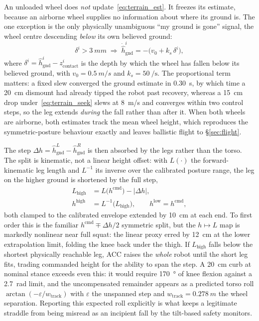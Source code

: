 \documentclass[conference]{IEEEtran}
\begin{document}
An unloaded wheel does \emph{not} update~\eqref{eq:terrain_est}. It freezes its
estimate, because an airborne wheel supplies no information about where its
ground is. The one exception is the only physically unambiguous
``my ground is gone'' signal, the wheel centre descending \emph{below} its own
believed ground:
\begin{equation}
\delta^{i} > \SI{3}{mm}
\;\Rightarrow\;
\dot{\hat{h}}_{\text{gnd}}^{i} = -\big(v_0 + k_s \,\delta^{i}\big),
\label{eq:terrain_seek}
\end{equation}
where $\delta^{i} = \hat{h}_{\text{gnd}}^{i} - z_{\text{contact}}^{i}$ is the
depth by which the wheel has fallen below its believed ground,
with $v_0 = \SI{0.5}{m/s}$ and $k_s = \SI{50}{\per\second}$. The
proportional term matters: a fixed slew converged the ground estimate in
\SI{0.30}{s}, by which time a \SI{20}{cm} dismount had already tipped the robot
past recovery, whereas a \SI{15}{cm} drop under~\eqref{eq:terrain_seek} slews at
\SI{8}{m/s} and converges within two control steps, so the leg extends
\emph{during} the fall rather than after it. When both wheels are airborne, both
estimates track the mean wheel height, which reproduces the symmetric-posture
behaviour exactly and leaves ballistic flight to
\S\ref{sec:flight}.

The step $\Delta h = \hat{h}_{\text{gnd}}^{L} - \hat{h}_{\text{gnd}}^{R}$ is
then absorbed by the legs rather than the torso. The split is kinematic, not a
linear height offset: with $L(\cdot)$ the forward-kinematic leg length and
$L^{-1}$ its inverse over the calibrated posture range, the leg on the higher
ground is shortened by the full step,
\begin{align}
L_{\text{high}} &= L\big(h^{\text{cmd}}\big) - |\Delta h|,\\
h^{\text{high}} &= L^{-1}\!\big(L_{\text{high}}\big), \qquad
h^{\text{low}} = h^{\text{cmd}},
\label{eq:terrain_split}
\end{align}
both clamped to the calibrated envelope extended by \SI{10}{cm} at each end. To
first order this is the familiar $h^{\text{cmd}} \mp \Delta h/2$ symmetric
split, but the $h \mapsto L$ map is markedly nonlinear near full squat: the
linear proxy erred by \SI{12}{cm} at the lower extrapolation limit, folding the
knee back under the thigh. If $L_{\text{high}}$ falls below the shortest
physically reachable leg, ACC raises the \emph{whole} robot until the short leg
fits, trading commanded height for the ability to span the step. A
\SI{20}{cm} curb at nominal stance exceeds even this: it would require
\SI{170}{\degree} of knee flexion against a \SI{2.7}{rad} limit, and the
uncompensated remainder appears as a predicted torso roll
$\arctan(-\varepsilon / w_{\text{track}})$ with $\varepsilon$ the unspanned
step and $w_{\text{track}} = \SI{0.278}{m}$ the wheel separation. Reporting
this expected roll explicitly is what keeps a legitimate straddle from being
misread as an incipient fall by the tilt-based safety monitors.
\end{document}
